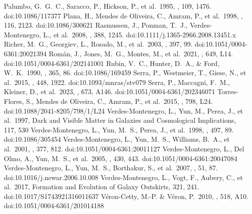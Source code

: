 \documentclass{aa}
\begin{document}
\begin{thebibliography}{}
      Palumbo, G.~G.~C., Saracco, P., Hickson, P., et al.\ 1995, \aj, 109, 1476. doi:10.1086/117377
      Plana, H., Mendes de Oliveira, C., Amram, P., et al.\ 1998, \aj, 116, 2123. doi:10.1086/300621
      Rasmussen, J., Ponman, T.~J., Verdes-Montenegro, L., et al.\ 2008, \mnras, 388, 1245. doi:10.1111/j.1365-2966.2008.13451.x
      Richer, M.~G., Georgiev, L., Rosado, M., et al.\ 2003, \aap, 397, 99. doi:10.1051/0004-6361:20021394
      Rom{\'a}n, J., Jones, M.~G., Montes, M., et al.\ 2021, \aap, 649, L14. doi:10.1051/0004-6361/202141001
      Rubin, V.~C., Hunter, D.~A., \& Ford, W.~K.\ 1990, \apj, 365, 86. doi:10.1086/169459
      Serra, P., Westmeier, T., Giese, N., et al.\ 2015, \mnras, 448, 1922. doi:10.1093/mnras/stv079
      Serra, P., Maccagni, F.~M., Kleiner, D., et al.\ 2023, \aap, 673, A146. doi:10.1051/0004-6361/202346071
      Torres-Flores, S., Mendes de Oliveira, C., Amram, P., et al.\ 2015, \apjl, 798, L24. doi:10.1088/2041-8205/798/1/L24
      Verdes-Montenegro, L., Yun, M., Perea, J., et al.\ 1997, Dark and Visible Matter in Galaxies and Cosmological Implications, 117, 530
      Verdes-Montenegro, L., Yun, M.~S., Perea, J., et al.\ 1998, \apj, 497, 89. doi:10.1086/305454
      Verdes-Montenegro, L., Yun, M.~S., Williams, B.~A., et al.\ 2001, \aap, 377, 812. doi:10.1051/0004-6361:20011127
      Verdes-Montenegro, L., Del Olmo, A., Yun, M.~S., et al.\ 2005, \aap, 430, 443. doi:10.1051/0004-6361:20047084
      Verdes-Montenegro, L., Yun, M.~S., Borthakur, S., et al.\ 2007, \nar, 51, 87. doi:10.1016/j.newar.2006.10.008
      Verdes-Montenegro, L., Vogt, F., Aubery, C., et al.\ 2017, Formation and Evolution of Galaxy Outskirts, 321, 241. doi:10.1017/S1743921316011637
      V{\'e}ron-Cetty, M.-P. \& V{\'e}ron, P.\ 2010, \aap, 518, A10. doi:10.1051/0004-6361/201014188

\end{thebibliography}
\end{document}
